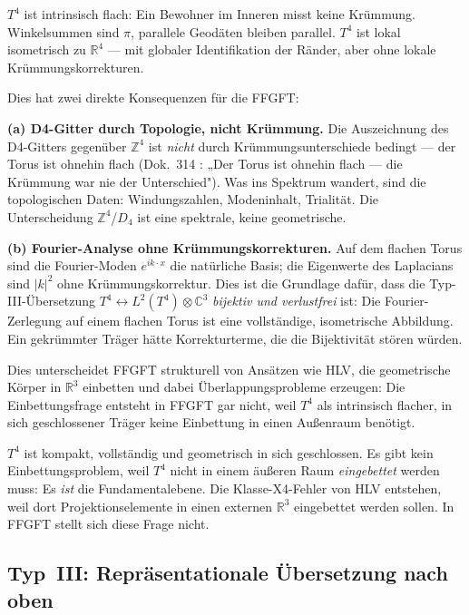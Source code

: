 \begin{tcolorbox}[ffgftbox,title={Intrinsisch flacher Torus \K}]
  $T^4$ ist intrinsisch flach: Ein Bewohner im Inneren misst keine
  Krümmung. Winkelsummen sind $\pi$, parallele Geodäten bleiben
  parallel. $T^4$ ist lokal isometrisch zu $\mathbb{R}^4$ —
  mit globaler Identifikation der Ränder, aber ohne lokale
  Krümmungskorrekturen.
\end{tcolorbox}

Dies hat zwei direkte Konsequenzen für die FFGFT:

\textbf{(a) D4-Gitter durch Topologie, nicht Krümmung.}
Die Auszeichnung des D4-Gitters gegenüber $\mathbb{Z}^4$ ist
\emph{nicht} durch Krümmungsunterschiede bedingt — der Torus ist
ohnehin flach (Dok.~314 \K: „Der Torus ist ohnehin flach —
die Krümmung war nie der Unterschied").
Was ins Spektrum wandert, sind die topologischen Daten:
Windungszahlen, Modeninhalt, Trialität. Die Unterscheidung
$\mathbb{Z}^4$/$D_4$ ist eine spektrale, keine geometrische.

\textbf{(b) Fourier-Analyse ohne Krümmungskorrekturen.}
Auf dem flachen Torus sind die Fourier-Moden $e^{ik \cdot x}$
die natürliche Basis; die Eigenwerte des Laplacians sind $|k|^2$
ohne Krümmungskorrektur. Dies ist die Grundlage dafür, dass die
Typ-III-Übersetzung $T^4 \leftrightarrow L^2(T^4) \otimes \mathbb{C}^3$
\emph{bijektiv und verlustfrei} ist: Die Fourier-Zerlegung auf einem
flachen Torus ist eine vollständige, isometrische Abbildung.
Ein gekrümmter Träger hätte Korrekturterme, die die Bijektivität
stören würden.

Dies unterscheidet FFGFT strukturell von Ansätzen wie HLV, die
geometrische Körper in $\mathbb{R}^3$ einbetten und dabei
Überlappungsprobleme erzeugen: Die Einbettungsfrage entsteht
in FFGFT gar nicht, weil $T^4$ als intrinsisch flacher,
in sich geschlossener Träger keine Einbettung in einen
Außenraum benötigt.



$T^4$ ist kompakt, vollständig und geometrisch in sich geschlossen.
Es gibt kein Einbettungsproblem, weil $T^4$ nicht in einem äußeren
Raum \emph{eingebettet} werden muss: Es \emph{ist} die Fundamentalebene.
Die Klasse-X4-Fehler von HLV entstehen, weil dort Projektionselemente
in einen externen $\mathbb{R}^3$ eingebettet werden sollen.
In FFGFT stellt sich diese Frage nicht.

\subsection{Typ~III: Repräsentationale Übersetzung nach oben}

